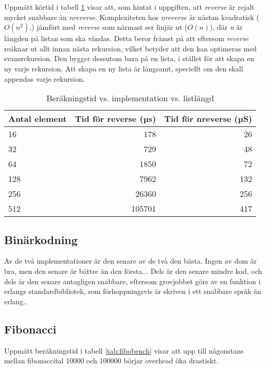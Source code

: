 \documentclass[a4paper, 11pt]{article}
\begin{document}
Uppmätt körtid i tabell \ref{tab:reverse} visar att, som hintat i uppgiften, att \emph{reverse} är rejalt mycket snabbare än \emph{nreverse}. Komplexiteten hos \emph{nreverse} är nästan kvadratisk ($O(n^2)$,) jämfört med \emph{reverse} som närmast ser linjär ut ($O(n)$), där \emph{n} är längden på listan som ska vändas. Detta beror främst på att eftersom \emph{reverse} reäknar ut allt innan nästa rekursion, vilket betyder att den kan optimeras med svansrekursion. Den bygger dessutom bara på en lista, i stället för att skapa en ny varje rekursion. Att skapa en ny lista är långsamt, speciellt om den skall appendas varje rekursion.

\begin{table}
\centering
\begin{tabular}{|l|r|r|}
\hline
Antal element & Tid för reverse (µs) & Tid för nreverse (µS)\\
\hline
16 & 178 & 26 \\
\hline
32 & 729 & 48 \\
\hline
64 & 1850 & 72 \\
\hline
128 & 7962 & 132 \\
\hline
256 & 26360 & 256 \\
\hline
512 & 105701 & 417 \\
\hline
\end{tabular}
\caption{Beräkningstid vs. implementation vs. listlängd}
\label{tab:reverse}
\end{table}



\subsection{Binärkodning}

Av de två implementationer är den senare av de två den bästa. Ingen av dom är bra, men den senare är bättre än den första... Dels är den senare mindre kod, och dels är den senare antagligen snabbare, eftersom grovjobbet görs av en funktion i erlangs standardbibliotek, som förhoppningsvis är skriven i ett snabbare språk än erlang..



\subsection{Fibonacci}

Uppmätt beräkningstid i tabell \ref{tab:fibobench} visar att upp till någonstans mellan fibonaccital 10000 och 100000 börjar overhead öka drastiskt.
\end{document}
